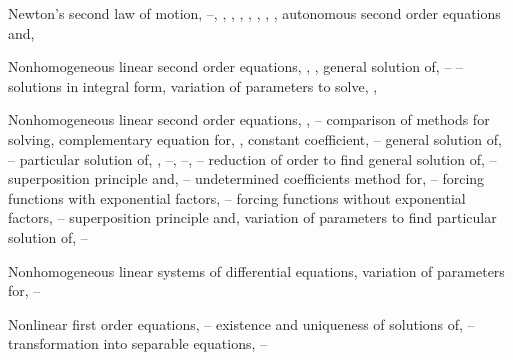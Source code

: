 \begin{theindex}
  \item Newton's second law of motion, \pageref{eq:4.3.1}--\pageref{eq:4.3.3}, \pageref{eq:4.4.6}, \pageref{eq:4.4.10}, \pageref{eq:4.4.26}, \pageref{exer:4.4.4}, \pageref{eq:6.1.1}, \pageref{eq:6.4.1}, \pageref{eq:10.1.8}, \pageref{example:10.1.3}
    \subitem autonomous second order equations and, \pageref{eq:4.4.6}

  \item Nonhomogeneous linear second order equations, \pageref{eq:2.1.1}, \pageref{eq:2.1.16}, \pageref{exer:2.1.1}
    \subitem general solution of, \pageref{eq:2.1.18}--\pageref{example:2.1.7} \pageref{thmtype:2.1.2}--\pageref{exer:2.1.1}
    \subitem solutions in integral form, \pageref{example:2.1.7}
    \subitem variation of parameters to solve, \pageref{eq:2.1.16}, \pageref{eq:2.1.26}

  \item Nonhomogeneous linear second order equations, \pageref{eq:5.1.1}, \pageref{eq:5.3.1}--\pageref{exer:5.7.39}
    \subitem comparison of methods for solving, \pageref{exer:5.7.1}
    \subitem complementary equation for, \pageref{eq:5.3.2}, \pageref{thmtype:5.3.2}
    \subitem constant coefficient, \pageref{eq:5.4.1}--\pageref{exer:5.6.40}
    \subitem general solution of, \pageref{thmtype:5.3.2}--\pageref{thmtype:5.3.3}
    \subitem particular solution of, \pageref{eq:5.3.2}, \pageref{thmtype:5.3.2}--\pageref{eq:5.3.17}, \pageref{eq:5.4.1}--\pageref{eq:5.4.17}, \pageref{eq:5.7.1}--\pageref{exer:5.7.1}
    \subitem reduction of order to find general solution of, \pageref{eq:5.6.1}--\pageref{exer:5.6.40}
    \subitem superposition principle and, \pageref{thmtype:5.3.3}--\pageref{eq:5.3.7}
    \subitem undetermined coefficients method for, \pageref{eq:5.4.1}--\pageref{exer:5.6.40}
      \subsubitem forcing functions with exponential factors, \pageref{eq:5.5.15}--\pageref{exer:5.5.1}
      \subsubitem forcing functions without exponential factors, \pageref{eq:5.5.1}--\pageref{thmtype:5.5.2}
      \subsubitem superposition principle and, \pageref{eq:5.4.17}
      \subsubitem variation of parameters to find particular solution of, \pageref{eq:5.7.1}--\pageref{exer:5.7.39}

  \item Nonhomogeneous linear systems of differential equations, \pageref{eq:10.2.1}
    \subitem variation of parameters for, \pageref{thmtype:10.7.1}--\pageref{exer:10.7.23}

  \item Nonlinear first order equations, \pageref{eq:2.2.20} \pageref{thmtype:2.3.1}--\pageref{exer:2.4.59}
    \subitem existence and uniqueness of solutions of, \pageref{thmtype:2.3.1}--\pageref{exer:2.4.59}
    \subitem transformation into separable equations, \pageref{eq:2.4.1}--\pageref{exer:2.4.59}


\end{theindex}
